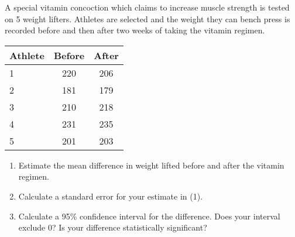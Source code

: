 \documentclass[11pt]{book}\usepackage[]{graphicx}\usepackage[]{color}
\begin{document}
\begin{exercises}
\begin{exercise}
\begin{center}
\end{center}

A special vitamin concoction which claims to increase muscle strength is tested on 5 weight lifters. Athletes are selected and the weight they can bench press is recorded before and then after two weeks of taking the vitamin regimen.

\begin{center}
\begin{tabular}{@{} lcc @{}} \hline
Athlete & Before & After \\ \hline
1 & 220 & 206 \\
2 & 181 & 179 \\
3 & 210 & 218 \\
4 & 231 & 235 \\
5 & 201 & 203 \\ \hline
\end{tabular}
\end{center}

\begin{enumerate}
\item Estimate the mean difference in weight lifted before and after the vitamin regimen.
\item Calculate a standard error for your estimate in (1).
\item Calculate a 95\% confidence interval for the difference. Does your interval exclude 0? Is your difference statistically significant?
\end{enumerate}

\end{exercise}
\begin{solution}  %


\end{solution}
\end{exercises}
\end{document}

